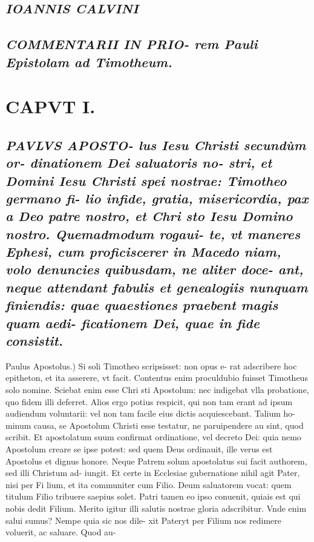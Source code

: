\documentclass{article}
\begin{document}
\begin{pages}
\subsection*{\textit{IOANNIS CALVINI }}
{}
\subsection*{\textit{COMMENTARII IN PRIO- rem Pauli Epistolam ad Timotheum. }}
\endnumbering\beginnumbering\section{CAPVT I.}
{}
\subsection*{\textit{\huge\textbf{P}\normalsize AVLVS APOSTO- lus Iesu Christi secundùm or- dinationem Dei saluatoris no- stri, et Domini Iesu Christi spei nostrae: Timotheo germano fi- lio infide, gratia, misericordia, pax a Deo patre nostro, et Chri sto Iesu Domino nostro. Quemadmodum rogaui- te, vt maneres Ephesi, cum proficiscerer in Macedo niam, volo denuncies quibusdam, ne aliter doce- ant, neque attendant fabulis et genealogiis nunquam finiendis: quae quaestiones praebent magis quam aedi- ficationem Dei, quae in fide consistit. }}\pstart Paulus Apostolus.) Si soli Timotheo scripsisset: non opus e- rat adscribere hoc epitheton, et ita asserere, vt facit. Contentus enim proculdubio fuisset Timotheus solo nomine. Sciebat enim esse Chri sti Apostolum: nec indigebat vlla probatione, quo fidem illi deferret. Alios ergo potius respicit, qui non tam erant ad ipsum audiendum voluntarii: vel non tam facile eius dictis acquiescebant. Talium ho- minum causa, se Apostolum Christi esse testatur, ne paruipendere au sint, quod scribit. Et apostolatum suum confirmat ordinatione, vel decreto Dei: quia nemo Apostolum creare se ipse potest: sed quem Deus ordinauit, ille verus est Apostolus et dignus honore. Neque Patrem solum apostolatus sui facit authorem, sed illi Christum ad- iungit. Et certe in Ecclesiae gubernatione nihil agit Pater, nisi per Fi lium, et ita communiter cum Filio. Deum saluatorem vocat: quem titulum Filio tribuere saepius solet. Patri tamen eo ipso conuenit, quiais est qui nobis dedit Filium. Merito igitur illi salutis nostrae gloria adscribitur. Vnde enim salui sumus? Nempe quia sic nos dile- xit Pateryt per Filium nos redimere voluerit, ac saluare. Quod au-  \pend

\end{pages}
\end{document}
